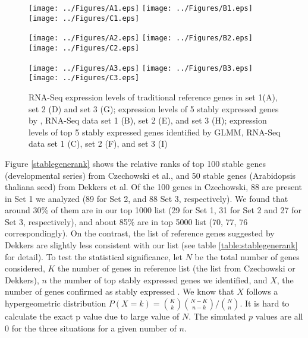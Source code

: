 \documentclass[11pt, a4paper]{article}
\begin{document}
\begin{landscape}
 \begin{figure}[H]
\begin{center}
\texttt{[image: ../Figures/A1.eps]}
\texttt{[image: ../Figures/B1.eps]}
\texttt{[image: ../Figures/C1.eps]}

\texttt{[image: ../Figures/A2.eps]}
\texttt{[image: ../Figures/B2.eps]}
\texttt{[image: ../Figures/C2.eps]}

\texttt{[image: ../Figures/A3.eps]}
\texttt{[image: ../Figures/B3.eps]}
\texttt{[image: ../Figures/C3.eps]}
\caption{{\small{\label{expressinlevel} RNA-Seq expression levels of traditional reference genes in set 1(A), set 2 (D) and set 3 (G)}; expression levels of 5 stably expressed genes by \cite{czechowski2005genome}, RNA-Seq data set 1 (B), set 2 (E), and set 3 (H); expression levels of top 5 stably expressed genes identified by GLMM, RNA-Seq data set 1 (C), set 2 (F), and set 3 (I) }}
\end{center}
\end{figure} 
\end{landscape}
Figure \ref{stablegenerank} shows the relative ranks of top 100 stable genes (developmental series) from Czechowski et al., and 50 stable genes (Arabidopsis thaliana seed) from Dekkers et al. Of the 100 genes in  Czechowski, 88 are present in Set 1 we analyzed (89 for Set 2, and 88  Set 3, respectively). We found that around 30\% of them are in our top 1000 list (29 for Set 1, 31 for Set 2 and 27 for Set 3, respectively), and about 85\% are in top 5000 list (70, 77, 76 correspondingly).  On the contrast, the list of reference genes suggested by Dekkers are slightly less consistent with our list (see table \ref{table:stablegenerank} for detail). To test the statistical significance, let $N$ be the total number of genes considered, $K$ the number of genes in reference list (the list from Czechowski or Dekkers), $n$ the number of top stably expressed genes we identified,  and $X$, the number of genes confirmed as stably expressed .  We know that $X$ follows a hypergeometric distribution $P(X = k) = {K \choose k}{N-K \choose n-k}/{N\choose n}$. It is hard to calculate the exact p value due to large value of $N$. The simulated $p$ values are all 0 for the three situations for a given number of $n$. 
\end{document}
